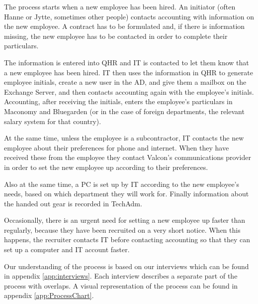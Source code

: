 The process starts when a new employee has been hired.
An initiator (often Hanne or Jytte, sometimes other people) contacts accounting with information on the new employee.
A contract has to be formulated and, if there is information missing, the new employee has to be contacted in order to complete their particulars.

The information is entered into QHR and IT is contacted to let them know that a new employee has been hired.
IT then uses the information in QHR to generate employee initials, create a new user in the AD, and give them a mailbox on the Exchange Server, and then contacts accounting again with the employee's initials.
Accounting, after receiving the initials, enters the employee's particulars in Maconomy and Bluegarden (or in the case of foreign departments, the relevant salary system for that country).

At the same time, unless the employee is a subcontractor, IT contacts the new employee about their preferences for phone and internet.
When they have received these from the employee they contact Valcon's communications provider in order to set the new employee up according to their preferences.

Also at the same time, a PC is set up by IT according to the new employee's needs, based on which department they will work for.
Finally information about the handed out gear is recorded in TechAdm.

Occasionally, there is an urgent need for setting a new employee up faster than regularly, because they have been recruited on a very short notice. When this happens, the recruiter contacts IT before contacting accounting so that they can set up a computer and IT account faster.

Our understanding of the process is based on our interviews which can be found in appendix \ref{app:interviews}. Each interview describes a separate part of the process with overlaps.
A visual representation of the process can be found in appendix \ref{app:ProcessChart}.